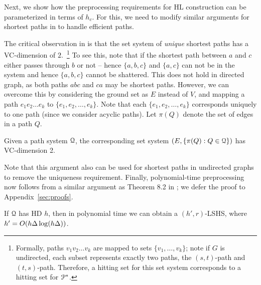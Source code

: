 Next, we show how the preprocessing requirements for HL construction can be parameterized in terms of $h_c$. For this, we need to modify similar arguments for shortest paths in \cite{highway2013} to handle efficient paths.

The critical observation in \cite{highway2013} is that the set system of \emph{unique} shortest paths has a VC-dimension of $2$.~\footnote{
Formally, paths $v_1v_2\ldots v_k$ are mapped to sets $\{v_1,\ldots,v_k\}$; note if $G$ is undirected, each subset represents exactly two paths, the $(s,t)$-path and $(t,s)$-path. Therefore, a hitting set for this set system corresponds to a hitting set for $\mathcal{P}^*$.}
To see this, note that if the shortest path between $a$ and $c$ either passes through $b$ or not -- hence $\{a,b,c\}$ and $\{a,c\}$ can not be in the system and hence $\{a,b,c\}$ cannot be shattered.
This does not hold in directed graph, as both paths $abc$ and $ca$ may be shortest paths. However, we can overcome this by considering the ground set as $E$ instead of $V$, and mapping a path $e_1e_2\ldots e_k$ to $\{e_1,e_2,\ldots,e_k\}$.
Note that each $\{e_1,e_2,\ldots,e_k\}$ corresponds uniquely to one path (since we consider acyclic paths).
Let $\pi(Q)$ denote the set of edges in a path $Q$.
\begin{proposition}
Given a path system $\mathcal{Q}$, the corresponding set system $(E,\{\pi(Q):Q\in\mathcal{Q}\})$ has VC-dimension 2.
\end{proposition}
Note that this argument also can be used for shortest paths in undirected graphs to remove the uniqueness requirement.
Finally, polynomial-time preprocessing now follows from a similar argument as Theorem 8.2 in \cite{highway2013}; we defer the proof to Appendix~\ref{sec:proofs}.

\begin{proposition}\label{prop:poly_lshs}
If $\mathcal{Q}$ has HD $h$, then in polynomial time we can obtain a $(h',r)$-LSHS, where $h'=O(h\Delta\log(h\Delta))$.	
\end{proposition}
